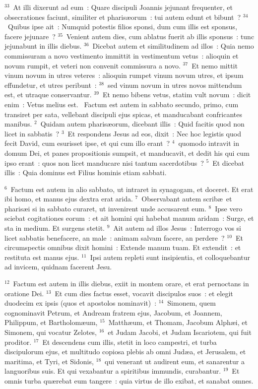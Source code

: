 ${}^{33}$~At illi dixerunt ad eum~: Quare discipuli Joannis jejunant frequenter, et obsecrationes faciunt, similiter et pharis\ae orum~: tui autem edunt et bibunt~?
${}^{34}$~Quibus ipse ait~: Numquid potestis filios sponsi, dum cum illis est sponsus, facere jejunare~?
${}^{35}$~Venient autem dies, cum ablatus fuerit ab illis sponsus~: tunc jejunabunt in illis diebus.
${}^{36}$~Dicebat autem et similitudinem ad illos~: Quia nemo commissuram a novo vestimento immittit in vestimentum vetus~: alioquin et novum rumpit, et veteri non convenit commissura a novo.
${}^{37}$~Et nemo mittit vinum novum in utres veteres~: alioquin rumpet vinum novum utres, et ipsum effundetur, et utres peribunt~:
${}^{38}$~sed vinum novum in utres novos mittendum est, et utraque conservantur.
${}^{39}$~Et nemo bibens vetus, statim vult novum~: dicit enim~: Vetus melius est.
~Factum est autem in sabbato secundo, primo, cum transiret per sata, vellebant discipuli ejus spicas, et manducabant confricantes manibus.
${}^{2}$~Quidam autem pharis\ae orum, dicebant illis~: Quid facitis quod non licet in sabbatis~?
${}^{3}$~Et respondens Jesus ad eos, dixit~: Nec hoc legistis quod fecit David, cum esurisset ipse, et qui cum illo erant~?
${}^{4}$~quomodo intravit in domum Dei, et panes propositionis sumpsit, et manducavit, et dedit his qui cum ipso erant~: quos non licet manducare nisi tantum sacerdotibus~?
${}^{5}$~Et dicebat illis~: Quia dominus est Filius hominis etiam sabbati.


${}^{6}$~Factum est autem in alio sabbato, ut intraret in synagogam, et doceret. Et erat ibi homo, et manus ejus dextra erat arida.
${}^{7}$~Observabant autem scrib\ae\ et pharis\ae i si in sabbato curaret, ut invenirent unde accusarent eum.
${}^{8}$~Ipse vero sciebat cogitationes eorum~: et ait homini qui habebat manum aridam~: Surge, et sta in medium. Et surgens stetit.
${}^{9}$~Ait autem ad illos Jesus~: Interrogo vos si licet sabbatis benefacere, an male~: animam salvam facere, an perdere~?
${}^{10}$~Et circumspectis omnibus dixit homini~: Extende manum tuam. Et extendit~: et restituta est manus ejus.
${}^{11}$~Ipsi autem repleti sunt insipientia, et colloquebantur ad invicem, quidnam facerent Jesu.


${}^{12}$~Factum est autem in illis diebus, exiit in montem orare, et erat pernoctans in oratione Dei.
${}^{13}$~Et cum dies factus esset, vocavit discipulos suos~: et elegit duodecim ex ipsis (quos et apostolos nominavit)~:
${}^{14}$~Simonem, quem cognominavit Petrum, et Andream fratrem ejus, Jacobum, et Joannem, Philippum, et Bartholom\ae um,
${}^{15}$~Matth\ae um, et Thomam, Jacobum Alph\ae i, et Simonem, qui vocatur Zelotes,
${}^{16}$~et Judam Jacobi, et Judam Iscariotem, qui fuit proditor.
${}^{17}$~Et descendens cum illis, stetit in loco campestri, et turba discipulorum ejus, et multitudo copiosa plebis ab omni Jud\ae a, et Jerusalem, et maritima, et Tyri, et Sidonis,
${}^{18}$~qui venerant ut audirent eum, et sanarentur a languoribus suis. Et qui vexabantur a spiritibus immundis, curabantur.
${}^{19}$~Et omnis turba qu\ae rebat eum tangere~: quia virtus de illo exibat, et sanabat omnes.


